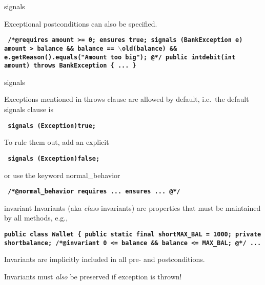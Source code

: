 \documentclass[
pdf,
nocolorBG,
slideColor,
erik,
]{prosper}
\newcommand{\code}[1]{{\rm \texttt{\textbf{\small #1}}}}
\newcommand{\old}     {\(\backslash\)old}
\begin{document}
\begin{slide}{signals}
\vspace*{-4ex}

{\blue Exceptional postconditions} can also be specified.
\vspace*{-1ex}
\begin{alltt}
\code{
{\green /*@}{\black requires} amount >= 0;
    {\black ensures}  true;
    {\blue signals (BankException e) 
               amount > balance         &&
               balance == \old(balance) &&
               e.getReason().equals("Amount too big");}
{\green   @*/}
  public int{\green debit}(int amount) throws BankException \{ 
   ...
  \}
}
\end{alltt} %

\end{slide}

\begin{slide}{signals}
\vspace*{-4ex}

Exceptions mentioned in throws clause are allowed by default,
i.e.\ the default signals clause is
\begin{alltt}\code{ {\blue signals} (Exception){\green true}; }
\end{alltt}

\medskip
To rule them out, add an explicit
\begin{alltt}\code{ {\blue signals} (Exception){\green false}; 
}

\end{alltt}
or use the keyword {\blue normal\_behavior}
\begin{alltt}
\code{ {\green /*@}{\blue normal\_behavior}
       {\black requires} ...
       {\black ensures}  ...              
 {\green   @*/}
}
\end{alltt}

\end{slide}

\begin{slide}{invariant}
\vspace*{-4ex}
{\blue Invariants} (aka {\em class} invariants) are properties that
must be maintained by all methods, e.g.,
\begin{alltt}
\code{public class {\green Wallet} \{
  public static final short{\green MAX_BAL} = 1000;
  private short{\green balance};
  {\green /*@}{\blue invariant 0 <= balance &&
                      balance <= MAX_BAL;}
  {\green   @*/}
  ...  }
\end{alltt} %

Invariants are implicitly included in all pre- and postconditions.

Invariants must {\em also} be preserved if exception is thrown!
\end{slide}
\end{document}
